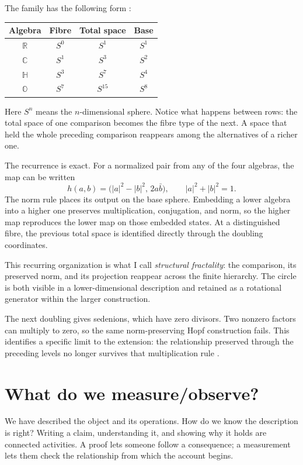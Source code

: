 \documentclass[11pt,a4paper]{article}
\theoremstyle{definition}
\newcommand{\R}{\mathbb R}
\newcommand{\C}{\mathbb C}
\newcommand{\HH}{\mathbb H}
\begin{document}
The family has the following form \citep{Baez2002}:
\begin{center}
\begin{tabular}{@{}cccc@{}}
\toprule
Algebra & Fibre & Total space & Base \\
\midrule
$\R$ & $S^0$ & $S^1$ & $S^1$ \\
$\C$ & $S^1$ & $S^3$ & $S^2$ \\
$\HH$ & $S^3$ & $S^7$ & $S^4$ \\
$\mathbb O$ & $S^7$ & $S^{15}$ & $S^8$ \\
\bottomrule
\end{tabular}
\end{center}
Here $S^n$ means the $n$-dimensional sphere. Notice what happens
between rows: the total space of one comparison becomes the fibre
type of the next. A space that held the whole preceding comparison
reappears among the alternatives of a richer one.

The recurrence is exact. For a normalized pair from any of the four
algebras, the map can be written
\[
 h(a,b)=\bigl(|a|^2-|b|^2,\,2a\bar b\bigr),
 \qquad |a|^2+|b|^2=1.
\]
The norm rule places its output on the base sphere. Embedding a lower
algebra into a higher one preserves multiplication, conjugation, and
norm, so the higher map reproduces the lower map on those embedded
states. At a distinguished fibre, the previous total space is
identified directly through the doubling coordinates.

This recurring organization is what I call \emph{structural
fractality}: the comparison, its preserved norm, and its projection
reappear across the finite hierarchy. The circle is both visible in
a lower-dimensional description and retained as a rotational
generator within the larger construction.

The next doubling gives sedenions, which have zero divisors. Two
nonzero factors can multiply to zero, so the same norm-preserving
Hopf construction fails. This identifies a specific limit to the
extension: the relationship preserved through the preceding levels
no longer survives that multiplication rule \citep{Baez2002}.

\section{What do we measure/observe?}
\label{sec:v1-grounding}

We have described the object and its operations. How do we know the
description is right? Writing a claim, understanding it, and showing
why it holds are connected activities. A proof lets someone follow
a consequence; a measurement lets them check the relationship from
which the account begins.
\end{document}
